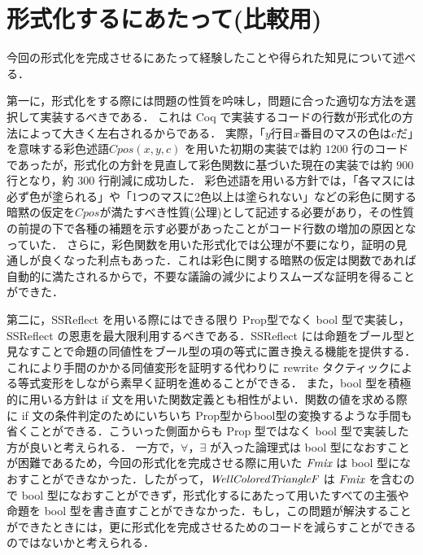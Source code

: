 \newpage
\section{形式化するにあたって(比較用)}

今回の形式化を完成させるにあたって経験したことや得られた知見について述べる．

第一に，形式化をする際には問題の性質を吟味し，問題に合った適切な方法を選択して実装するべきである．
これは Coq で実装するコードの行数が形式化の方法によって大きく左右されるからである．
実際，「$y$行目$x$番目のマスの色は$c$だ」を意味する彩色述語$Cpos(x,y,c)$ を用いた初期の実装では約 $1200$ 行のコードであったが，形式化の方針を見直して彩色関数に基づいた現在の実装では約 $900$ 行となり，約 $300$ 行削減に成功した．
彩色述語を用いる方針では，「各マスには必ず色が塗られる」や「1つのマスに2色以上は塗られない」などの彩色に関する暗黙の仮定を$Cpos$が満たすべき性質(公理)として記述する必要があり，その性質の前提の下で各種の補題を示す必要があったことがコード行数の増加の原因となっていた．
さらに，彩色関数を用いた形式化では公理が不要になり，証明の見通しが良くなった利点もあった．これは彩色に関する暗黙の仮定は関数であれば自動的に満たされるからで，不要な議論の減少によりスムーズな証明を得ることができた．

第二に，SSReflect を用いる際にはできる限り Prop型でなく bool 型で実装し，SSReflect の恩恵を最大限利用するべきである．SSReflect には命題をブール型と見なすことで命題の同値性をブール型の項の等式に置き換える機能を提供する．これにより手間のかかる同値変形を証明する代わりに rewrite タクティックによる等式変形をしながら素早く証明を進めることができる．
また，bool 型を積極的に用いる方針は if 文を用いた関数定義とも相性がよい．関数の値を求める際に if 文の条件判定のためにいちいち Prop型からbool型の変換するような手間も省くことができる．こういった側面からも Prop 型ではなく bool 型で実装した方が良いと考えられる．
一方で，$\forall$，$\exists$ が入った論理式は bool 型になおすことが困難であるため，今回の形式化を完成させる際に用いた $\textit{Fmix}$ は bool 型になおすことができなかった．したがって，$\textit{WellColoredTriangleF}$ は $\textit{Fmix}$ を含むので bool 型になおすことができず，形式化するにあたって用いたすべての主張や命題を bool 型を書き直すことができなかった．もし，この問題が解決することができたときには，更に形式化を完成させるためのコードを減らすことができるのではないかと考えられる．


\newpage
